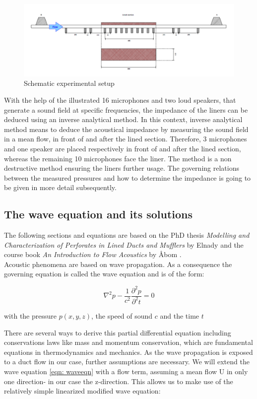 \documentclass[11pt]{report} %
\begin{document}
\begin{figure}[H]
\centering
\includegraphics[scale=0.8]{./Figures/experimental_setup}
\caption{Schematic experimental setup}
\end{figure}

With the help of the illustrated 16 microphones and two loud speakers, that generate a sound field at specific frequencies, the impedance of the liners can be deduced using an inverse analytical method.
In this context, inverse analytical method means to deduce the acoustical impedance by measuring the sound field in a mean flow, in front of and after the lined section.
Therefore, 3 microphones and one speaker are placed respectively in front of and after the lined section, whereas the remaining 10 microphones face the liner.
The method is a non destructive method ensuring the liners further usage.
The governing relations between the measured pressures and how to determine the impedance is going to be given in more detail subsequently.

\subsection{The wave equation and its solutions}
The following sections and equations are based on the PhD thesis \textit{Modelling and Characterization of Perforates in Lined Ducts and Mufflers} by Elnady \cite{Elnady2004} and the course book \textit{An Introduction to Flow Acoustics} by Åbom \cite{Abom2010}.\\ 
Acoustic phenomena are based on wave propagation. As a consequence the governing equation is called the wave equation and is of the form: 

\begin{equation}
    \nabla^2p-\frac{1}{c^2}\frac{\partial^2p}{\partial^2t}  = 0 \label{eqn: waveeqn}
 \end{equation} 
 
with the pressure $p(x,y,z)$, the speed of sound $c$ and the time $t$

There are several ways to derive this partial differential equation including conservations laws like mass and momentum conservation, which are fundamental equations in thermodynamics and mechanics.  
As the wave propagation is exposed to a duct flow in our case, further assumptions are necessary.
We will extend the wave equation \eqref{eqn: waveeqn} with a flow term, assuming a mean flow U in only one direction- in our case the z-direction.
This allows us to make use of the relatively simple linearized modified wave equation: 
\end{document}
